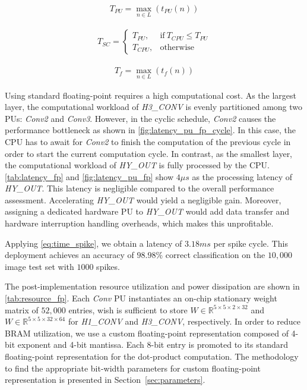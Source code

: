 \begin{eqnarray} \label{eq:time_pu}
T_{PU} = \max_{n\in L}(t_{PU}(n))
\end{eqnarray}

\begin{eqnarray} \label{eq:time_spike}
T_{SC} =
\begin{cases}
T_{PU}, & \text{if}\ T_{CPU}\le T_{PU} \\
T_{CPU}, & \text{otherwise}
\end{cases}
\end{eqnarray}

\begin{eqnarray} \label{eq:time_finish}
T_{f} = \max_{n\in L}(t_{f}(n))
\end{eqnarray}

Using standard floating-point requires a high computational cost. As the largest layer, the computational workload of \emph{H3\_CONV} is evenly partitioned among two PUs: \emph{Conv2} and \emph{Conv3}. However, in the cyclic schedule, \emph{Conv2} causes the performance bottleneck as shown in \ref{fig:latency_pu_fp_cycle}. In this case, the CPU has to await for \emph{Conv2} to finish the computation of the previous cycle in order to start the current computation cycle. In contrast, as the smallest layer, the computational workload of \emph{HY\_OUT} is fully processed by the CPU. \ref{tab:latency_fp} and \ref{fig:latency_pu_fp} show $4\mu s$ as the processing latency of \emph{HY\_OUT}. This latency is negligible compared to the overall performance assessment. Accelerating \emph{HY\_OUT} would yield a negligible gain. Moreover, assigning a dedicated hardware PU to \emph{HY\_OUT} would add data transfer and hardware interruption handling overheads, which makes this unprofitable.

Applying \ref{eq:time_spike}, we obtain a latency of $3.18 ms$ per spike cycle. This deployment achieves an accuracy of $98.98\%$ correct classification on the $10,000$ image test set with $1000$ spikes.

The post-implementation resource utilization and power dissipation are shown in \ref{tab:resource_fp}.
Each \emph{Conv} PU instantiates an on-chip stationary weight matrix of $52,000$ entries, wish is sufficient to store $W\in\mathbb{R}^{5\times 5\times 2\times 32}$ and $W\in\mathbb{R}^{5\times 5\times 32\times 64}$ for \emph{H1\_CONV} and \emph{H3\_CONV}, respectively. In order to reduce BRAM utilization, we use a custom floating-point representation composed of 4-bit exponent and 4-bit mantissa. Each 8-bit entry is promoted to its standard floating-point representation for the dot-product computation. The methodology to find the appropriate bit-width parameters for custom floating-point representation is presented in Section~\ref{sec:parameters}.

